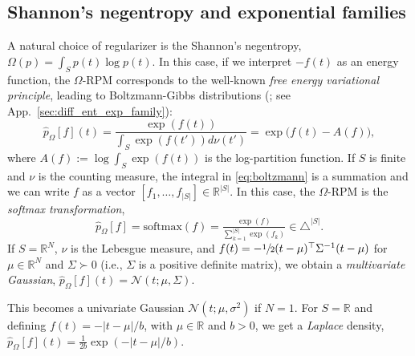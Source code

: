 \documentclass{article}
\newcommand{\remove}[1]{}
\begin{document}
\subsection{Shannon's negentropy and exponential families}

A natural choice of regularizer is the {Shannon's negentropy}, $\Omega(p) = \int_S p(t)\log p(t)$. 
In this case, if we interpret $-f(t)$ as an energy function, the $\Omega$-RPM corresponds to the well-known {\it free energy variational principle}, leading to Boltzmann-Gibbs distributions (\citep{cover2012elements}; see App.~\ref{sec:diff_ent_exp_family}): 
\begin{equation}\label{eq:boltzmann}
\hat{p}_\Omega[f](t) = \frac{\exp(f(t))}{\int_S \exp(f(t'))d\nu(t')} = \exp \bigl(f(t) - A(f)\bigr),
\end{equation}
where 
$A(f) := \log \int_S \exp(f(t))$
is the log-partition function. 
If $S$ is finite and $\nu$ is the counting measure, the integral in \eqref{eq:boltzmann} is a summation and we can write $f$ as a vector $[f_1, \ldots, f_{|S|}] \in \mathbb{R}^{|S|}$. In this case, the $\Omega$-RPM is the {\it softmax transformation},
\begin{equation}
\hat{p}_\Omega[f] = \mathrm{softmax}(f) = \tfrac{\exp(f)}{\sum_{k=1}^{|S|} \exp(f_k)} \in \triangle^{|S|}.
\end{equation}
If $S=\mathbb{R}^N$, $\nu$ is the Lebesgue measure, and $f(t) = -\sfrac{1}{2} (t-\mu)^\top\Sigma^{-1}(t-\mu)$ for $\mu \in \mathbb{R}^N$ and $\Sigma \succ 0$ (i.e., $\Sigma$ is a positive definite matrix), 
we obtain a {\it multivariate Gaussian}, $\hat{p}_{\Omega}[f](t) = \mathcal{N}(t; \mu, \Sigma)$. 
\remove{with Shannon negentropy $\Omega(p) = -\sfrac{1}{2}\log \det (2\pi e \Sigma)$.} 
This becomes a univariate Gaussian $\mathcal{N}(t; \mu, \sigma^2)$ if $N=1$. 
For $S=\mathbb{R}$ and defining $f(t) = -|t-\mu|/b$, with  $\mu \in \mathbb{R}$ and $b>0$, we get a {\it Laplace} density, $\hat{p}_{\Omega}[f](t) = \tfrac{1}{2b}\exp\left(-|t-\mu|/b\right)$. \remove{, with Shannon negentropy $\Omega(p) = -\log(2b e)$.}
\end{document}
